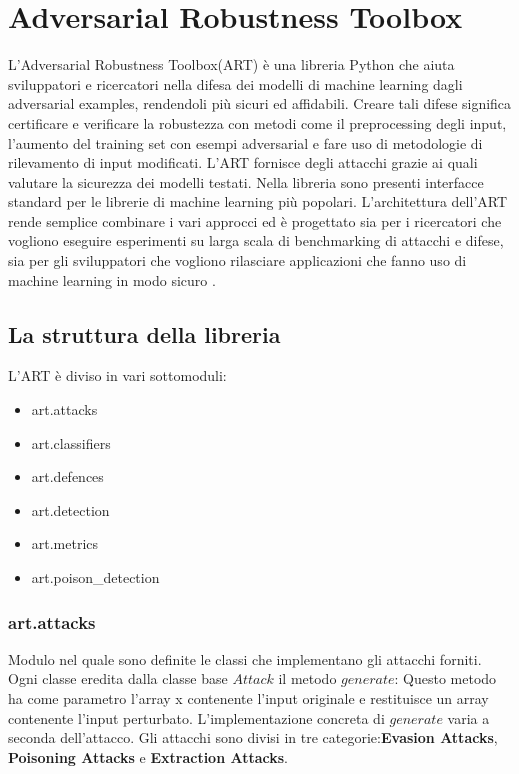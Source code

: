 \newpage
\section{Adversarial Robustness Toolbox}
L'Adversarial Robustness Toolbox(ART) è una libreria Python che aiuta sviluppatori e ricercatori nella difesa dei modelli di machine learning dagli adversarial examples, rendendoli più sicuri 
ed affidabili. Creare tali difese significa certificare e verificare la robustezza con metodi come il preprocessing degli input,  l'aumento del training set
con esempi adversarial e fare uso di metodologie di rilevamento di input modificati. L'ART fornisce degli attacchi grazie ai quali valutare la sicurezza dei modelli
testati. Nella libreria sono presenti interfacce standard per le librerie di machine learning più popolari. L'architettura dell'ART rende semplice combinare i vari approcci  ed è progettato sia per i ricercatori che vogliono eseguire esperimenti su larga scala di benchmarking di attacchi e difese, sia per gli sviluppatori 
che vogliono rilasciare applicazioni che fanno uso di machine learning in modo sicuro \cite{art2018}.
\subsection{La struttura della libreria}
L'ART è diviso in vari sottomoduli:
\begin{itemize}
    \item art.attacks
    \item art.classifiers
    \item art.defences
    \item art.detection
    \item art.metrics
    \item art.poison\_detection
\end{itemize}

\subsubsection{art.attacks}
Modulo nel quale sono definite  le classi che implementano gli attacchi forniti. Ogni classe eredita dalla classe base  $Attack$ il metodo $generate$: Questo metodo ha come parametro l'array x contenente l'input originale e restituisce
un array contenente l'input perturbato. L'implementazione concreta di $generate$ varia a seconda dell'attacco. Gli attacchi sono divisi in tre categorie:\textbf{Evasion Attacks},
\textbf{Poisoning Attacks} e \textbf{Extraction Attacks}. 
